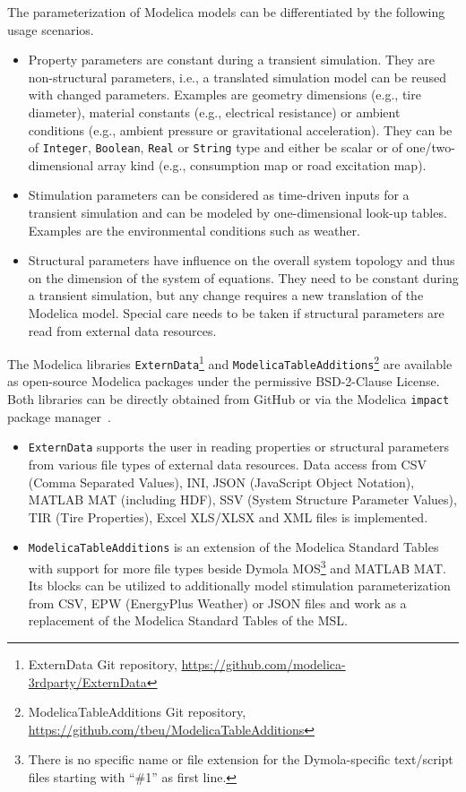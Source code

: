 \documentclass{modelica}
\newcommand{\modelica}[1]{\lstinline[language=modelica]|#1|}
\begin{document}
The parameterization of Modelica models can be differentiated by the following usage scenarios.
\begin{itemize}
 \item Property parameters are constant during a transient simulation. They are non-structural parameters, i.e., a translated simulation model can be reused with changed parameters. Examples are geometry dimensions (e.g., tire diameter), material constants (e.g., electrical resistance) or ambient conditions (e.g., ambient pressure or gravitational acceleration). They can be of \modelica{Integer}, \modelica{Boolean}, \modelica{Real} or \modelica{String} type and either be scalar or of one/two-dimensional array kind (e.g., consumption map or road excitation map).
 \item Stimulation parameters can be considered as time-driven inputs for a transient simulation and can be modeled by one-dimensional look-up tables. Examples are the environmental conditions such as weather.
 \item Structural parameters have influence on the overall system topology and thus on the dimension of the system of equations. They need to be constant during a transient simulation, but any change requires a new translation of the Modelica model. Special care needs to be taken if structural parameters are read from external data resources.
\end{itemize}

The Modelica libraries \modelica{ExternData}\footnote{ExternData Git repository, \url{https://github.com/modelica-3rdparty/ExternData}} and \modelica{ModelicaTableAdditions}\footnote{ModelicaTableAdditions Git repository, \url{https://github.com/tbeu/ModelicaTableAdditions}} are available as open-source Modelica packages under the permissive BSD-2-Clause License.
Both libraries can be directly obtained from GitHub or via the Modelica \modelica{impact} package manager~\cite{Tiller2015WhereIG}.
\begin{itemize}
 \item \modelica{ExternData} supports the user in reading properties or structural parameters from various file types of external data resources.
 Data access from CSV (Comma Separated Values), INI, JSON (JavaScript Object Notation), MATLAB MAT (including HDF), SSV (System Structure Parameter Values), TIR (Tire Properties), Excel XLS/XLSX and XML files is implemented. 
 \item \modelica{ModelicaTableAdditions} is an extension of the Modelica Standard Tables~\cite{modelica2014tables} with support for more file types beside Dymola MOS\footnote{There is no specific name or file extension for the Dymola-specific text/script files starting with ``\#1'' as first line.} and MATLAB MAT.
 Its blocks can be utilized to additionally model stimulation parameterization from CSV, EPW (EnergyPlus Weather) or JSON files and work as a replacement of the Modelica Standard Tables of the MSL.
\end{itemize}
\end{document}
